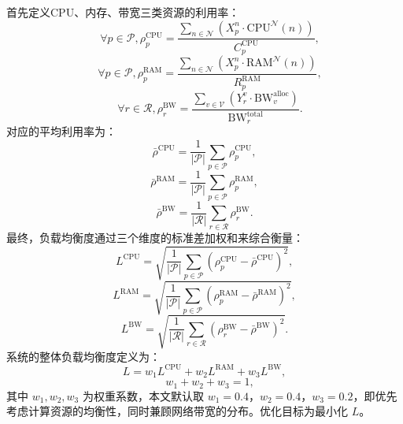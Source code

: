 首先定义CPU、内存、带宽三类资源的利用率：
\begin{equation}
\quad \forall p \in \mathcal{P}, \rho_p^{\text{CPU}} = \frac{\sum\limits_{n \in \mathcal{N}} \left( X_p^{n} \cdot \text{CPU}^\mathcal{N}(n) \right)}{C_p^{\text{CPU}}}, 
\end{equation}
\begin{equation}
\quad \forall p \in \mathcal{P}, \rho_p^{\text{RAM}} = \frac{\sum\limits_{n \in \mathcal{N}} \left( X_p^{n} \cdot \text{RAM}^\mathcal{N}(n) \right)}{R_p^{\text{RAM}}}, 
\end{equation}
\begin{equation}
\quad \forall r \in \mathcal{R}, \rho_r^{\text{BW}} = \frac{\sum\limits_{v \in \mathcal{V}} \left( Y_r^v \cdot \text{BW}_v^{\text{alloc}} \right)}{\text{BW}_r^{\text{total}}}. 
\end{equation}
对应的平均利用率为：
\begin{equation}
\bar{\rho}^{\text{CPU}} = \frac{1}{|\mathcal{P}|} \sum_{p \in \mathcal{P}} \rho_p^{\text{CPU}},
\end{equation}
\begin{equation}
\bar{\rho}^{\text{RAM}} = \frac{1}{|\mathcal{P}|} \sum_{p \in \mathcal{P}} \rho_p^{\text{RAM}},
\end{equation}
\begin{equation}
\bar{\rho}^{\text{BW}} = \frac{1}{|\mathcal{R}|} \sum_{r \in \mathcal{R}} \rho_r^{\text{BW}}.
\end{equation}
最终，负载均衡度通过三个维度的标准差加权和来综合衡量：
\begin{equation}
L^{\text{CPU}} = \sqrt{\frac{1}{|\mathcal{P}|} \sum_{p \in \mathcal{P}} (\rho_p^{\text{CPU}} - \bar{\rho}^{\text{CPU}})^2},
\end{equation}
\begin{equation}
L^{\text{RAM}} = \sqrt{\frac{1}{|\mathcal{P}|} \sum_{p \in \mathcal{P}} (\rho_p^{\text{RAM}} - \bar{\rho}^{\text{RAM}})^2},
\end{equation}
\begin{equation}
L^{\text{BW}} = \sqrt{\frac{1}{|\mathcal{R}|} \sum_{r \in \mathcal{R}} (\rho_r^{\text{BW}} - \bar{\rho}^{\text{BW}})^2}.
\end{equation}
系统的整体负载均衡度定义为：
\begin{equation}
L = w_1 L^{\text{CPU}} + w_2 L^{\text{RAM}} + w_3 L^{\text{BW}},
\end{equation}
\begin{equation}
\quad w_1 + w_2 + w_3 = 1,
\end{equation}
其中 $w_1, w_2, w_3$ 为权重系数，本文默认取 $w_1 = 0.4$，$w_2 = 0.4$，$w_3 = 0.2$，即优先考虑计算资源的均衡性，同时兼顾网络带宽的分布。优化目标为最小化 $L$。

